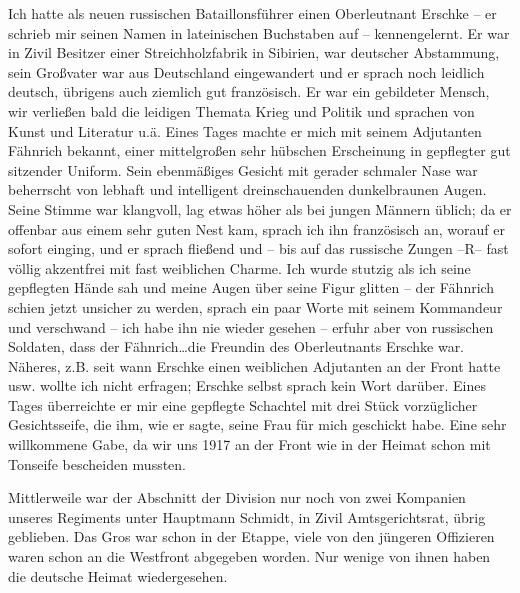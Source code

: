 \documentclass[a5paper,pagesize,10pt,twoside=true]{scrbook}
\begin{document}
Ich hatte als neuen russischen Bataillonsführer einen Oberleutnant Erschke -- er schrieb mir seinen Namen in lateinischen Buchstaben auf -- kennengelernt. Er war in Zivil Besitzer einer Streichholzfabrik in Sibirien, war deutscher Abstammung, sein Großvater war aus Deutschland eingewandert und er sprach noch leidlich deutsch, übrigens auch ziemlich gut französisch. Er war ein gebildeter Mensch, wir verließen bald die leidigen Themata Krieg und Politik und sprachen von Kunst und Literatur u.ä. Eines Tages machte er mich mit seinem Adjutanten Fähnrich bekannt, einer mittelgroßen sehr hübschen Erscheinung in gepflegter gut sitzender Uniform. Sein ebenmäßiges Gesicht mit gerader schmaler Nase war beherrscht von lebhaft und intelligent dreinschauenden dunkelbraunen Augen. Seine Stimme war klangvoll, lag etwas höher als bei jungen Männern üblich; da er offenbar aus einem sehr guten Nest kam, sprach ich ihn französisch an, worauf er sofort einging, und er sprach fließend und -- bis auf das russische Zungen --R-- fast völlig akzentfrei mit fast weiblichen Charme. Ich wurde stutzig als ich seine gepflegten Hände sah und meine Augen über seine Figur glitten -- der Fähnrich schien jetzt unsicher zu werden, sprach ein paar Worte mit seinem Kommandeur und verschwand -- ich habe ihn nie wieder gesehen -- erfuhr aber von russischen Soldaten, dass der Fähnrich\dots die Freundin des Oberleutnants Erschke war. Näheres, z.B. seit wann Erschke einen weiblichen Adjutanten an der Front hatte usw. wollte ich nicht erfragen; Erschke selbst sprach kein Wort darüber. Eines Tages überreichte er mir eine gepflegte Schachtel mit drei Stück vorzüglicher Gesichtsseife, die ihm, wie er sagte, seine Frau für mich geschickt habe. Eine sehr willkommene Gabe, da wir uns 1917 an der Front wie in der Heimat schon mit Tonseife bescheiden mussten.

Mittlerweile war der Abschnitt der Division nur noch von zwei Kompanien unseres Regiments unter Hauptmann Schmidt, in Zivil Amtsgerichtsrat, übrig geblieben. Das Gros war schon in der Etappe, viele von den jüngeren Offizieren waren schon an die Westfront abgegeben worden. Nur wenige von ihnen haben die deutsche Heimat wiedergesehen.
\end{document}
